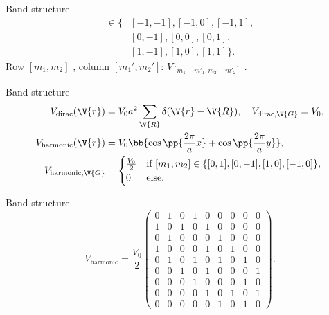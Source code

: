 \documentclass{beamer}
\newcommand{\coef}[1]{_{[#1]}}
\begin{document}
\begin{frame}{Band structure}
\begin{align*}
[m_1, m_2] \in \{ &[-1, -1], [-1, 0], [-1, 1],\\ &[0, -1], [0, 0], [0, 1],\\ &[1,-1], [1, 0], [1,1]  \}.
\end{align*}
Row $ [m_1, m_2] $ , column $ [m_1', m_2'] $: $ V\coef{m_1-m'_1, m_2-m'_2} $ .
\end{frame}

\begin{frame}{Band structure}
\begin{align*}\label{key}
	V_{\text{dirac}}(\V{r}) &= V_0 a^2 \sum_{\V{R}} \delta(\V{r}-\V{R}), \quad V_{\text{dirac},\V{G}} = V_0, \\
	V_{\text{harmonic}}(\V{r}) &= V_0 \bb{\cos\pp{\frac{2\pi}{a} x} + \cos\pp{\frac{2\pi}{a} y}},\\
	V_{\text{harmonic}, \V{G}} &= \begin{cases}
	\frac{V_0}{2} 	& \text{if } [m_1, m_2] \in \{[0,1], [0,-1], [1,0], [-1,0]\}, \\
	0					& \text{else}.
	\end{cases}
\end{align*}
\end{frame}

\begin{frame}{Band structure}
\begin{equation*}
V_{\text{harmonic}} = \frac{V_0}{2} \begin{pmatrix}
0 & 1 & 0 & 1 & 0 & 0 & 0 & 0 & 0 \\
1 & 0 & 1 & 0 & 1 & 0 & 0 & 0 & 0 \\
0 & 1 & 0 & 0 & 0 & 1 & 0 & 0 & 0 \\
1 & 0 & 0 & 0 & 1 & 0 & 1 & 0 & 0 \\
0 & 1 & 0 & 1 & 0 & 1 & 0 & 1 & 0 \\
0 & 0 & 1 & 0 & 1 & 0 & 0 & 0 & 1 \\
0 & 0 & 0 & 1 & 0 & 0 & 0 & 1 & 0 \\
0 & 0 & 0 & 0 & 1 & 0 & 1 & 0 & 1 \\
0 & 0 & 0 & 0 & 0 & 1 & 0 & 1 & 0
\end{pmatrix}.
\end{equation*}
\end{frame}
\end{document}
